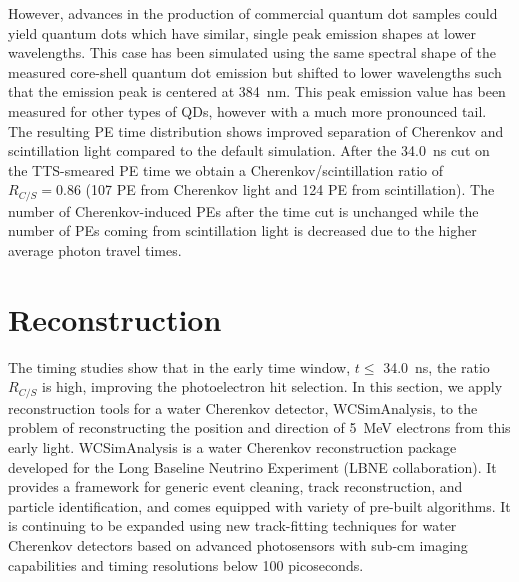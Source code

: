 \documentclass[aps,prc,twocolumn,groupedaddress,showpacs,amsmath,amssymb,floatfix,superscriptaddress]{revtex4}
\begin{document}
However, advances in the production of commercial quantum dot samples
could yield quantum dots which have similar, single peak emission
shapes at lower wavelengths. This case has been simulated using the
same spectral shape of the measured core-shell quantum dot emission
but shifted to lower wavelengths such that the emission peak is
centered at 384~nm. This peak emission value has been measured for
other types of QDs, however with a much more pronounced 
tail\cite{qdot2}. The resulting PE time distribution shows improved
separation of Cherenkov and scintillation light compared to the
default simulation. After the 34.0~ns cut on the TTS-smeared PE time
we obtain a Cherenkov/scintillation ratio of $R_{C/S}=0.86$ (107 PE
from Cherenkov light and 124 PE from scintillation). The number of
Cherenkov-induced PEs after the time cut is unchanged while the number
of PEs coming from scintillation light is decreased due to the higher
average photon travel times.

\section{Reconstruction}
\label{reconstruction_sec}

\begin{figure*}[tbh]
        \begin{center}
        \caption[]{\label{fig:reco} (Left) The reconstructed direction,
        $(\frac{p_x}{|\vec{p}|}, \frac{p_y}{|\vec{p}|},
        \frac{p_z}{|\vec{p}|})$, for the simulation of 1000 electrons
        (5~MeV). In the simulation the electrons are produced along the
        x-axis, $\frac{\vec{p}}{|\vec{p}|}$ = (1,0,0), and originate
        from the center of the 6.5m-radius detector, $\vec{r}$ =
        (0,0,0). Only photons with arrival time of $t<$ 34.0~ns are used
        in the reconstruction. The quantum efficiency of the bialkali
        photocathode is taken into account. (Right) The reconstructed
        vertex position, $(x,y,z)$, for the same simulation.}

\end{center}
\end{figure*}

The timing studies show that in the early time window, $t\leq$
34.0~ns, the ratio $R_{C/S}$ is high, improving the photoelectron hit selection. In this section, we apply
reconstruction tools for a water Cherenkov detector, WCSimAnalysis,
to the problem of reconstructing the position and direction of 5~MeV
electrons from this early light.  WCSimAnalysis is a water Cherenkov
reconstruction package developed for the Long Baseline Neutrino
Experiment (LBNE collaboration)\cite{Blake}. It provides a framework
for generic event cleaning, track reconstruction, and particle
identification, and comes equipped with variety of pre-built
algorithms. It is continuing to be expanded using new track-fitting
techniques for water Cherenkov detectors\cite{Sanchez2012525} based on
advanced photosensors with sub-cm imaging capabilities and timing
resolutions below 100 picoseconds\cite{LAPPDSum,LAPPDTDR}.
\end{document}

